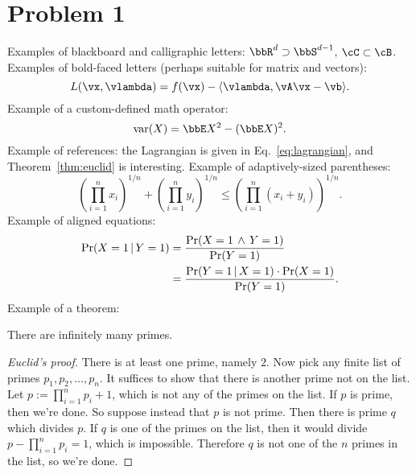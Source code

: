 \documentclass[twoside,11pt]{homework}
\begin{document}
\maketitle

\section*{Problem 1}


Examples of blackboard and calligraphic letters: $\bbR^d \supset
\bbS^{d-1}$, $\cC \subset \cB$.
Examples of bold-faced letters (perhaps suitable for matrix and
vectors):
\begin{equation}
  L(\vx,\vlambda) = f(\vx) - \innerprod{\vlambda,\vA\vx-\vb} .
  \label{eq:lagrangian}
\end{equation}
\newcommand\var{\ensuremath{\operatorname{var}}}%
Example of a custom-defined math operator:
\[
  \var(X) = \bbE X^2 - (\bbE X)^2 .
\]
Example of references: the Lagrangian is given in
Eq.~\eqref{eq:lagrangian}, and Theorem~\ref{thm:euclid} is
interesting.
Example of adaptively-sized parentheses:
\[
  \left(\prod_{i=1}^n x_i\right)^{1/n}
  + \left(\prod_{i=1}^n y_i\right)^{1/n}
  \leq
  \left(\prod_{i=1}^n (x_i + y_i)\right)^{1/n}
  .
\]
Example of aligned equations:
\begin{align}
  \Pr(X = 1 \,|\, Y = 1)
  & = \frac{\Pr(X = 1 \,\wedge\, Y = 1)}{\Pr(Y = 1)}
  \notag \\
  & = \frac{\Pr(Y = 1 \,|\, X = 1) \cdot \Pr(X = 1)}{\Pr(Y = 1)}
  .
  \label{eq:bayes-rule}
\end{align}
Example of a theorem:
\begin{theorem}[Euclid]
  \label{thm:euclid}
  There are infinitely many primes.
\end{theorem}
\begin{proof}[Euclid's proof]
  There is at least one prime, namely $2$.
  Now pick any finite list of primes $p_1, p_2, \dotsc, p_n$.
  It suffices to show that there is another prime not on the list.
  Let $p := \prod_{i=1}^n p_i + 1$, which is not any of the primes on
  the list.
  If $p$ is prime, then we're done.
  So suppose instead that $p$ is not prime.
  Then there is prime $q$ which divides $p$.
  If $q$ is one of the primes on the list, then it would divide $p -
  \prod_{i=1}^n p_i = 1$, which is impossible.
  Therefore $q$ is not one of the $n$ primes in the list, so we're
  done.
\end{proof}
\end{document}
